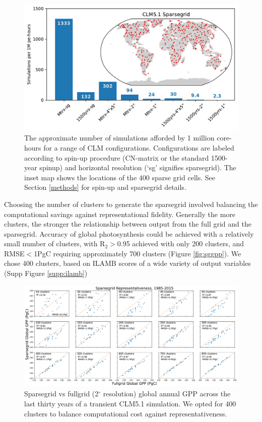\documentclass[draft]{agujournal2019}
\begin{document}
\begin{figure}[h]
\centering
\includegraphics[width=30pc]{../figs/sims.pdf}
\caption{The approximate number of simulations afforded by 1 million core-hours for a range of CLM configurations. Configurations are labeled according to spin-up procedure (CN-matrix or the standard 1500-year spinup) and horizontal resolution (`sg' signifies sparsegrid). The inset map shows the locations of the 400 sparse grid cells. See Section \ref{methods} for spin-up and sparsegrid details.}
\label{fig:sims}
\end{figure}


Choosing the number of clusters to generate the sparsegrid involved balancing the computational savings against representational fidelity. Generally the more clusters, the 
stronger the relationship between output from the full grid and the sparsegrid. Accuracy of global photosynthesis could be achieved with a relatively small number of clusters, with R$_2>$0.95 achieved with only 200 clusters, and RMSE$<$1PgC requiring approximately 700 clusters (Figure \ref{fig:sggpp}). We chose 400 clusters, based on ILAMB scores of a wide variety of output variables (Supp Figure \ref{supp:ilamb})
\begin{figure}[h]
\centering
\includegraphics[width=35pc]{../figs/sparsegrid_gpp.pdf}
\caption{Sparsegrid vs fullgrid (2$^{\circ}$ resolution) global annual GPP across the last thirty years of a transient CLM5.1 simulation. We opted for 400 clusters to balance computational cost against representativeness.}
\label{fig:sg}
\end{figure}
\end{document}
